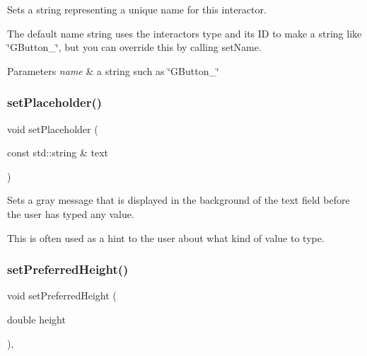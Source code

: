 Sets a string representing a unique name for this interactor. 

The default name string uses the interactor\textquotesingle{}s type and its ID to make a string like \char`\"{}\+G\+Button\+\_\char`\"{}, but you can override this by calling set\+Name. 
\begin{DoxyParams}{Parameters}
{\em name} & a string such as \char`\"{}\+G\+Button\+\_\char`\"{} \\
\hline
\end{DoxyParams}
\mbox{\label{classGTextField_aa21a9bebb4652ab6780d0c11eff47aee}} 
\subsubsection{\texorpdfstring{set\+Placeholder()}{setPlaceholder()}}
{\footnotesize\ttfamily void set\+Placeholder (\begin{DoxyParamCaption}\item[{const std\+::string \&}]{text }\end{DoxyParamCaption})\hspace{0.3cm}{\ttfamily [virtual]}}



Sets a gray message that is displayed in the background of the text field before the user has typed any value. 

This is often used as a hint to the user about what kind of value to type. \mbox{\label{classGInteractor_a1ab987704fce32098706c6f00fb08218}} 
\subsubsection{\texorpdfstring{set\+Preferred\+Height()}{setPreferredHeight()}}
{\footnotesize\ttfamily void set\+Preferred\+Height (\begin{DoxyParamCaption}\item[{double}]{height }\end{DoxyParamCaption})\hspace{0.3cm}{\ttfamily [virtual]}, {\ttfamily [inherited]}}



